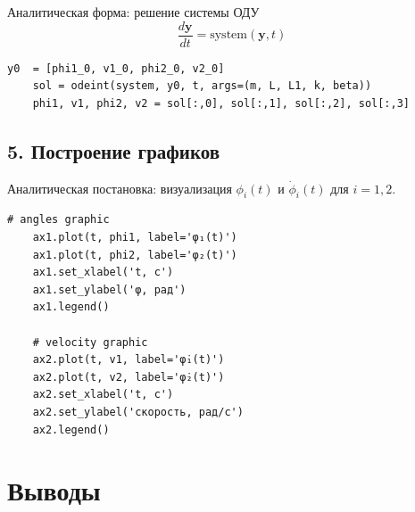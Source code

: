 \documentclass[a4paper,11pt]{article}
\theoremstyle{definition}
\begin{document}
Аналитическая форма: решение системы ОДУ
\begin{equation}
  \frac{d\mathbf{y}}{dt} = \mathrm{system}(\mathbf{y}, t)\label{eq:equation3}
\end{equation}

\begin{lstlisting}[language=MyPython,label={lst:lstlisting4}]
    y0  = [phi1_0, v1_0, phi2_0, v2_0]
    sol = odeint(system, y0, t, args=(m, L, L1, k, beta))
    phi1, v1, phi2, v2 = sol[:,0], sol[:,1], sol[:,2], sol[:,3]
\end{lstlisting}

\subsection*{5. Построение графиков}

Аналитическая постановка: визуализация $\phi_i(t)$ и $\dot{\phi}_i(t)$ для $i=1,2$.

\begin{lstlisting}[language=MyPython,label={lst:lstlisting5}]
    # angles graphic
    ax1.plot(t, phi1, label='φ₁(t)')
    ax1.plot(t, phi2, label='φ₂(t)')
    ax1.set_xlabel('t, с')
    ax1.set_ylabel('φ, рад')
    ax1.legend()

    # velocity graphic
    ax2.plot(t, v1, label='φ̇₁(t)')
    ax2.plot(t, v2, label='φ̇₂(t)')
    ax2.set_xlabel('t, с')
    ax2.set_ylabel('скорость, рад/с')
    ax2.legend()
\end{lstlisting}

%
%


\section*{Выводы}
\end{document}
